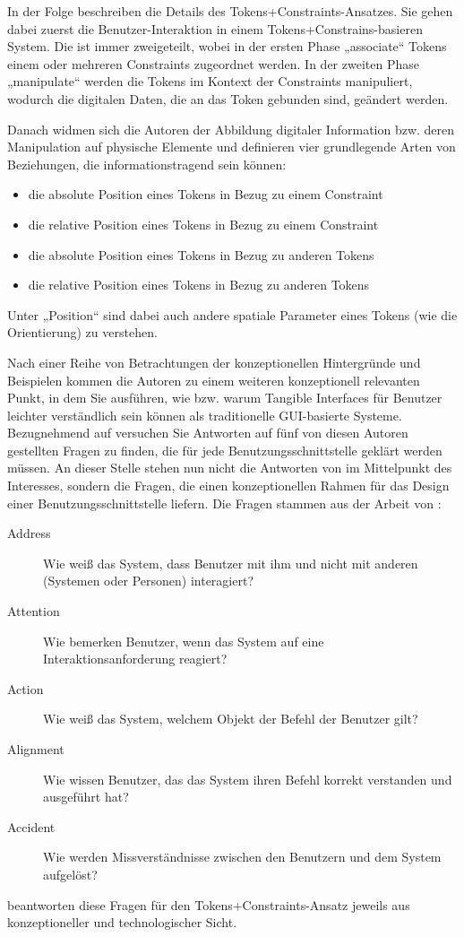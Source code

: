 In der Folge beschreiben \citeauthor{Ullmer05} die Details des Tokens+Constraints-Ansatzes. Sie gehen dabei zuerst die Benutzer-Interaktion in einem Tokens+Constrains-basieren System. Die ist immer zweigeteilt, wobei in der ersten Phase „associate“ Tokens einem oder mehreren Constraints zugeordnet werden. In der zweiten Phase „manipulate“ werden die Tokens im Kontext der Constraints manipuliert, wodurch die digitalen Daten, die an das Token gebunden sind, geändert werden.

Danach widmen sich die Autoren der Abbildung digitaler Information bzw. deren Manipulation auf physische Elemente und definieren vier grundlegende Arten von Beziehungen, die informationstragend sein können:
\begin{itemize}
	\item die absolute Position eines Tokens in Bezug zu einem Constraint
	\item die relative Position eines Tokens in Bezug zu einem Constraint
	\item die absolute Position eines Tokens in Bezug zu anderen Tokens
	\item die relative Position eines Tokens in Bezug zu anderen Tokens
\end{itemize}
Unter „Position“ sind dabei auch andere spatiale Parameter eines Tokens (wie die Orientierung) zu verstehen.

Nach einer Reihe von Betrachtungen der konzeptionellen Hintergründe und Beispielen kommen die Autoren zu einem weiteren konzeptionell relevanten Punkt, in dem Sie ausführen, wie bzw. warum Tangible Interfaces für Benutzer leichter verständlich sein können als traditionelle \gls{GUI}-basierte Systeme. Bezugnehmend auf \citet{Bellotti02} versuchen Sie Antworten auf fünf von diesen Autoren gestellten Fragen zu finden, die für jede Benutzungsschnittstelle geklärt werden müssen. An dieser Stelle stehen nun nicht die Antworten von \citeauthor{Ullmer05} im Mittelpunkt des Interesses, sondern die Fragen, die einen konzeptionellen Rahmen für das Design einer Benutzungsschnittstelle liefern. Die Fragen stammen aus der Arbeit von \citet{Bellotti02}:
\begin{description}
	\item[Address] Wie weiß das System, dass Benutzer mit ihm und nicht mit anderen (Systemen oder Personen) interagiert?
	\item[Attention] Wie bemerken Benutzer, wenn das System auf eine Interaktionsanforderung reagiert? 
	\item[Action] Wie weiß das System, welchem Objekt der Befehl der Benutzer gilt?
	\item[Alignment] Wie wissen Benutzer, das das System ihren Befehl korrekt verstanden und ausgeführt hat?
	\item[Accident] Wie werden Missverständnisse zwischen den Benutzern und dem System aufgelöst?
\end{description}
\citeauthor{Ullmer05} beantworten diese Fragen für den Tokens+Constraints-Ansatz jeweils aus konzeptioneller und technologischer Sicht. 

